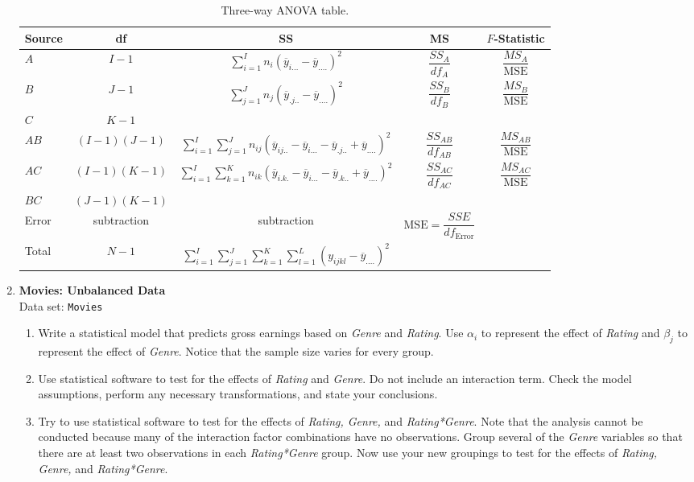 \documentclass[
]{book}
\begin{document}
\begin{enumerate}
\begin{table}[!h]
\centering
\caption{\label{tab:tab49}Three-way ANOVA table.}
\centering
\begin{tabular}[t]{lcccc}
\toprule
Source & df & SS & MS & $F$-Statistic\\
\midrule
$A$ & $I - 1$ & $\displaystyle\sum_{i=1}^{I} n_i (\overline{y}_{i...} - \overline{y}_{....})^2$ & $\dfrac{SS_A}{df_A}$ & $\dfrac{MS_A}{\text{MSE}}$\\
$B$ & $J - 1$ & $\displaystyle\sum_{j=1}^{J} n_j (\overline{y}_{.j..} - \overline{y}_{....})^2$ & $\dfrac{SS_B}{df_B}$ & $\dfrac{MS_B}{\text{MSE}}$\\
$C$ & $K - 1$ &  &  & \\
$AB$ & $(I-1)(J-1)$ & $\displaystyle\sum_{i=1}^I\sum_{j=1}^J n_{ij}(\overline{y}_{ij..} - \overline{y}_{i...} - \overline{y}_{.j..} + \overline{y}_{....})^2$ & $\dfrac{SS_{AB}}{df_{AB}}$ & $\dfrac{MS_{AB}}{\text{MSE}}$\\
$AC$ & $(I-1)(K-1)$ & $\displaystyle\sum_{i=1}^I\sum_{k=1}^K n_{ik}(\overline{y}_{i.k.} - \overline{y}_{i...} - \overline{y}_{.k..} + \overline{y}_{....})^2$ & $\dfrac{SS_{AC}}{df_{AC}}$ & $\dfrac{MS_{AC}}{\text{MSE}}$\\
\addlinespace
$BC$ & $(J-1)(K-1)$ &  &  & \\
Error & subtraction & subtraction & $\text{MSE} = \dfrac{SSE}{df_{\text{Error}}}$ & \\
Total & $N-1$ & $\displaystyle\sum_{i=1}^I\sum_{j=1}^J\sum_{k=1}^K\sum_{l=1}^L (y_{ijkl} - \overline{y}_{....})^2$ &  & \\
\bottomrule
\end{tabular}
\end{table}

  \item \textbf{Movies: Unbalanced Data}\\
  Data set: \texttt{Movies}
  \begin{enumerate}
    \item Write a statistical model that predicts gross earnings based on \textit{Genre} and \textit{Rating}. Use $\alpha_i$ to represent the effect of \textit{Rating} and $\beta_j$ to represent the effect of \textit{Genre}. Notice that the sample size varies for every group.
    \item Use statistical software to test for the effects of \textit{Rating} and \textit{Genre}. Do not include an interaction term. Check the model assumptions, perform any necessary transformations, and state your conclusions.
    \item Try to use statistical software to test for the effects of \textit{Rating, Genre,} and \textit{Rating*Genre}. Note that the analysis cannot be conducted because many of the interaction factor combinations have no observations. Group several of the \textit{Genre} variables so that there are at least two observations in each \textit{Rating*Genre} group. Now use your new groupings to test for the effects of \textit{Rating, Genre,} and \textit{Rating*Genre}.
  \end{enumerate}


\end{enumerate}
\end{document}
